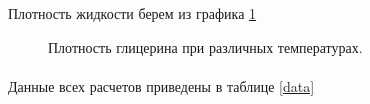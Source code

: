 \documentclass[a4paper, 12pt]{article}
\begin{document}
    Плотность жидкости берем из графика \ref{density}
    \begin{figure}[h]
        \caption{Плотность глицерина при различных температурах.}
        \label{density}
    \end{figure}
    \paragraph{}
    Данные всех расчетов приведены в таблице \ref{data}

    \newpage
\end{document}
